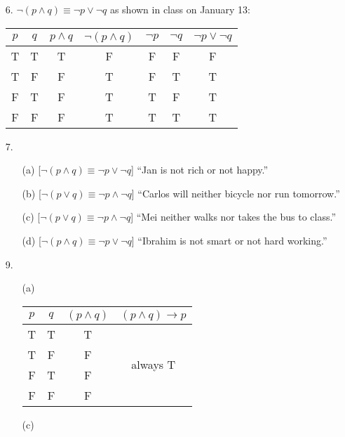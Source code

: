 \documentclass{article}
\begin{document}
\begin{enumerate}
    \item[6.] $\neg (p \land q) \equiv \neg p \lor \neg q$ as shown in class on January 13:
    \newline
    \begin{tabular}{|c|c|c|c|c|c|c|}\hline
    $p$ & $q$ & $p \land q$ & $\neg (p \land q)$ & $\neg p$ & $\neg q$ & $\neg p \lor \neg q$ \\\hline
    T & T & T & F & F & F & F \\
    T & F & F & T & F & T & T \\
    F & T & F & T & T & F & T \\
    F & F & F & T & T & T & T \\\hline
    \end{tabular}
    \item[7.]
    \begin{itemize}
        \item[(a)] [$\neg (p \land q) \equiv \neg p \lor \neg q$] ``Jan is not rich or not happy.''
        \item[(b)] [$\neg (p \lor q) \equiv \neg p \land \neg q$] ``Carlos will neither bicycle nor run tomorrow.''
        \item[(c)] [$\neg (p \lor q) \equiv \neg p \land \neg q$] ``Mei neither walks nor takes the bus to class.''
        \item[(d)] [$\neg (p \land q) \equiv \neg p \lor \neg q$] ``Ibrahim is not smart or not hard working.''
    \end{itemize}
    \item[9.]
    \begin{itemize}
        \item[(a)]\hfill
        \vspace{-0.1in}
        \newline
        \begin{tabular}{|c|c|c|c|}\hline
        $p$ & $q$ & $(p \land q)$ & $(p \land q) \rightarrow p$ \\\hline
        T & T & T & \multirow{4}{*}{always T} \\
        T & F & F & \\
        F & T & F & \\
        F & F & F & \\\hline
        \end{tabular}
        \item[(c)]\hfill
        \vspace{-0.1in}
        \newline
        \begin{tabular}{|c|c|c|c|c|}\hline

\end{tabular}
\end{itemize}
\end{enumerate}
\end{document}
